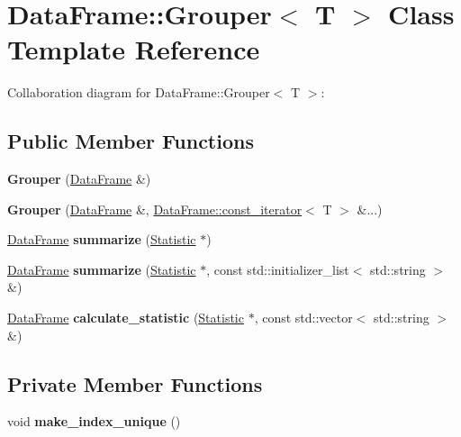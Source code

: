 \hypertarget{classDataFrame_1_1Grouper}{}\section{Data\+Frame\+:\+:Grouper$<$ T $>$ Class Template Reference}
\label{classDataFrame_1_1Grouper}


Collaboration diagram for Data\+Frame\+:\+:Grouper$<$ T $>$\+:
\subsection*{Public Member Functions}
\begin{DoxyCompactItemize}
\item 
\mbox{\label{classDataFrame_1_1Grouper_a474177da006d9ba18bd4bf2fd3809dd4}} 
{\bfseries Grouper} (\hyperlink{classDataFrame}{Data\+Frame} \&)
\item 
\mbox{\label{classDataFrame_1_1Grouper_a007f10e0f9d08889544ad2f826862bbe}} 
{\bfseries Grouper} (\hyperlink{classDataFrame}{Data\+Frame} \&, \hyperlink{classDataFrame_1_1const__iterator}{Data\+Frame\+::const\+\_\+iterator}$<$ T $>$ \&...)
\item 
\mbox{\label{classDataFrame_1_1Grouper_a3347426a8a949290a7ab25235b7877a6}} 
\hyperlink{classDataFrame}{Data\+Frame} {\bfseries summarize} (\hyperlink{classStatistic}{Statistic} $\ast$)
\item 
\mbox{\label{classDataFrame_1_1Grouper_a65232400969fd8e6ee3b72a1e8caa561}} 
\hyperlink{classDataFrame}{Data\+Frame} {\bfseries summarize} (\hyperlink{classStatistic}{Statistic} $\ast$, const std\+::initializer\+\_\+list$<$ std\+::string $>$ \&)
\item 
\mbox{\label{classDataFrame_1_1Grouper_a2c51fb8faf10ba8a3d9f351003d01383}} 
\hyperlink{classDataFrame}{Data\+Frame} {\bfseries calculate\+\_\+statistic} (\hyperlink{classStatistic}{Statistic} $\ast$, const std\+::vector$<$ std\+::string $>$ \&)
\end{DoxyCompactItemize}
\subsection*{Private Member Functions}
\begin{DoxyCompactItemize}
\item 
\mbox{\label{classDataFrame_1_1Grouper_aa8519a3b8eb2c8fa471a2de09516ba9e}} 
void {\bfseries make\+\_\+index\+\_\+unique} ()
\end{DoxyCompactItemize}
